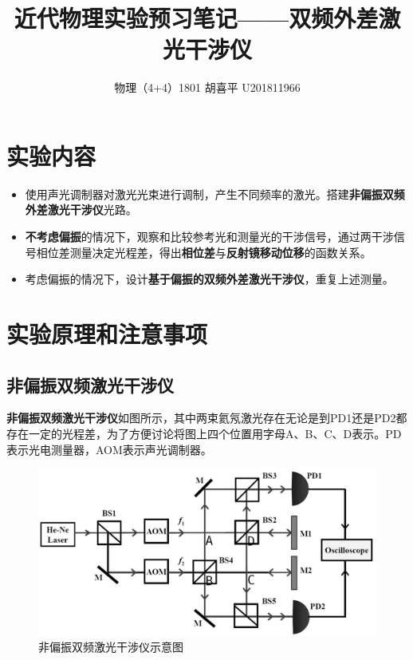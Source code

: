 \documentclass{article}
\author{物理（4+4）1801 \quad  胡喜平 \quad U201811966}
\affil{个人网站 https://hxp.plus/ \quad 电子邮件 hxp201406@gmail.com}
\title{近代物理实验预习笔记——双频外差激光干涉仪}
\begin{document}
\maketitle\thispagestyle{fancy}

\section{实验内容}

\begin{itemize}
\item 使用声光调制器对激光光束进行调制，产生不同频率的激光。搭建\textbf{非偏振双频外差激光干涉仪}光路。
\item \textbf{不考虑偏振}的情况下，观察和比较参考光和测量光的干涉信号，通过两干涉信号相位差测量决定光程差，得出\textbf{相位差}与\textbf{反射镜移动位移}的函数关系。
\item 考虑偏振的情况下，设计\textbf{基于偏振的双频外差激光干涉仪}，重复上述测量。
\end{itemize}

\section{实验原理和注意事项}

\subsection{非偏振双频激光干涉仪}

\textbf{非偏振双频激光干涉仪}如图所示，其中两束氦氖激光存在无论是到PD1还是PD2都存在一定的光程差，为了方便讨论将图上四个位置用字母A、B、C、D表示。PD表示光电测量器，AOM表示声光调制器。

\begin{figure}[H]
  \centering
  \includegraphics[width=0.9\linewidth]{figures/非偏振双频激光干涉仪}
  \caption{非偏振双频激光干涉仪示意图}
\end{figure}
\end{document}
